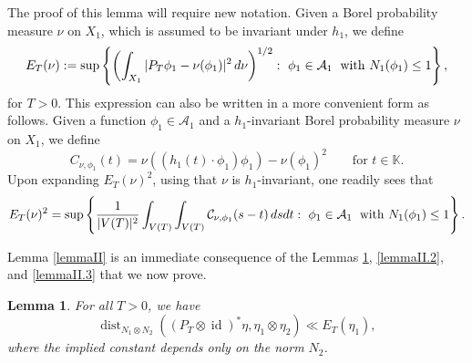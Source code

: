 \documentclass[11pt,reqno,a4paper]{amsart}
\numberwithin{equation}{section}
\newcommand{\cA}{\mathcal{A}}
\newcommand{\cC}{\mathcal{C}}
\newcommand{\bK}{\mathbb{K}}
\DeclareMathOperator{\dist}{dist}
\DeclareMathOperator{\id}{id}
\theoremstyle{theorem}
\newtheorem{lemma}[theorem]{Lemma}
\theoremstyle{definition}
\begin{document}
The proof of this lemma will require new notation. Given a Borel probability measure $\nu$ on $X_1$, which is assumed to be invariant under $h_1$, we define
\[
E_T(\nu): = \sup\left\{ \left( \int_{X_1} |P_T \phi_1 - \nu(\phi_1)|^2 \, d\nu \right)^{1/2}  : \,\, \phi_1 \in \cA_1\;\hbox{ with } N_1(\phi_1) \leq 1 \right\},
\]
for $T > 0$. This expression can also be written in a more convenient form as follows.
Given a function $\phi_1 \in \cA_1$ and a $h_1$-invariant Borel probability measure $\nu$ on $X_1$, 
we define
\[
C_{\nu,\phi_1}(t) = \nu((h_1(t) \cdot \phi_1) \phi_1) - \nu(\phi_1)^2 \quad\quad \textrm{for $t \in \bK$}.
\]
Upon expanding $E_T(\nu)^2$, using that $\nu$ is $h_1$-invariant, one readily sees that
\begin{equation}
\label{expand}
E_T(\nu)^2 = \sup\left\{ \frac{1}{|V(T)|^2} \int_{V(T)} \int_{V(T)}\cC_{\nu,\phi_1}(s-t) \, ds dt  : \,\, \phi_1 \in \cA_1\;\hbox{ with } N_1(\phi_1) \leq 1 \right\}.
\end{equation}



Lemma \ref{lemmaII} is an immediate consequence of the Lemmas \ref{lemmaII.1},
\ref{lemmaII.2}, and \ref{lemmaII.3} that we now prove. 
\begin{lemma}
\label{lemmaII.1}
For all $T > 0$, we have
\begin{equation}
\label{eqlemmaII.1}
\dist_{N_1 \otimes N_2}((P_T\otimes \id)^*\eta,\eta_1 \otimes \eta_2)
\ll 
E_T(\eta_1),
\end{equation}
where the implied constant depends only on the norm $N_2$.
\end{lemma}
\end{document}
